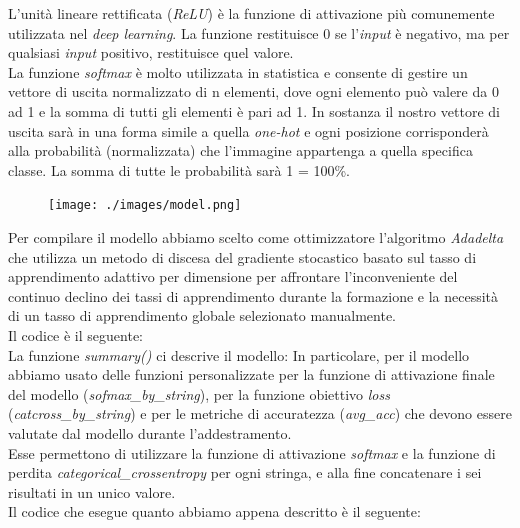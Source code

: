 L'unità lineare rettificata (\textit{ReLU}) è la funzione di attivazione più comunemente utilizzata nel \textit{deep learning}. La funzione restituisce 0 se l'\textit{input} è negativo, ma per qualsiasi \textit{input} positivo, restituisce quel valore.\\
La funzione \textit{softmax} è molto utilizzata in statistica e consente di gestire un vettore di uscita normalizzato di n elementi, dove ogni elemento può valere da 0 ad 1 e la somma di tutti gli elementi è pari ad 1. In sostanza il nostro vettore di uscita sarà in una forma simile a quella \textit{one-hot} e ogni posizione corrisponderà alla probabilità (normalizzata) che l’immagine appartenga a quella specifica classe. La somma di tutte le probabilità sarà 1 = 100\%.
\begin{figure}[H]
	\centering
	\texttt{[image: ./images/model.png]}
\end{figure}
\noindent Per compilare il modello abbiamo scelto come ottimizzatore l'algoritmo \textit{Adadelta} che utilizza un metodo di discesa del gradiente stocastico basato sul tasso di apprendimento adattivo per dimensione per affrontare l'inconveniente del continuo declino dei tassi di apprendimento durante la formazione e la necessità di un tasso di apprendimento globale selezionato manualmente.\\
Il codice è il seguente:\\
\newline
\vspace*{2ex}
\vspace*{2ex}
\noindent La funzione \textit{summary()} ci descrive il modello:
\vspace*{2ex}
\vspace*{2ex}
\noindent In particolare, per il modello abbiamo usato delle funzioni personalizzate per la funzione di attivazione finale del modello (\textit{sofmax\_by\_string}), per la funzione obiettivo \textit{loss} (\textit{catcross\_by\_string}) e per le metriche di accuratezza (\textit{avg\_acc}) che devono essere valutate dal modello durante l'addestramento.\\
Esse permettono di utilizzare la funzione di attivazione \textit{softmax} e la funzione di perdita \textit{categorical\_crossentropy} per ogni stringa, e alla fine concatenare i sei risultati in un unico valore.\\
\newline
Il codice che esegue quanto abbiamo appena descritto è il seguente:
